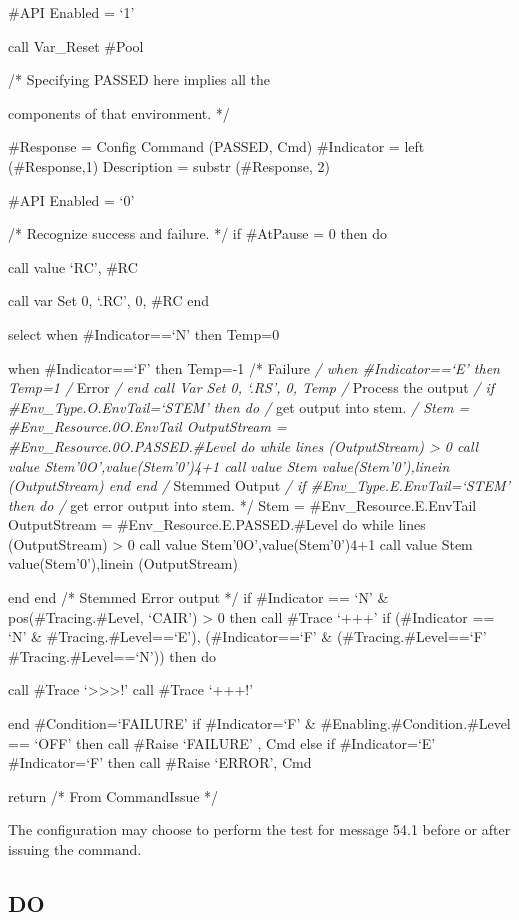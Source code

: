 \#API Enabled = `1'

call Var\_Reset \#Pool

/* Specifying PASSED here implies all the

components of that environment. */

\#Response = Config Command (PASSED, Cmd) \#Indicator = left
(\#Response,1) Description = substr (\#Response, 2)

\#API Enabled = `0'

/* Recognize success and failure. */ if \#AtPause = 0 then do

call value `RC', \#RC

call var Set 0, `.RC', 0, \#RC end

select when \#Indicator==`N' then Temp=0

when \#Indicator==`F' then Temp=-1 /* Failure \emph{/ when
\#Indicator==`E' then Temp=1 /} Error \emph{/ end call Var Set 0, `.RS',
0, Temp /} Process the output \emph{/ if \#Env\_Type.O.EnvTail=`STEM'
then do /} get output into stem. \emph{/ Stem =
\#Env\_Resource.0O.EnvTail OutputStream =
\#Env\_Resource.0O.PASSED.\#Level do while lines (OutputStream)
\textgreater{} 0 call value Stem'0O',value(Stem'0')4+1 call value
Stem\textbar{} \textbar value(Stem'0'),linein (OutputStream) end end /}
Stemmed Output \emph{/ if \#Env\_Type.E.EnvTail=`STEM' then do /} get
error output into stem. */ Stem = \#Env\_Resource.E.EnvTail OutputStream
= \#Env\_Resource.E.PASSED.\#Level do while lines (OutputStream)
\textgreater{} 0 call value Stem'0O',value(Stem'0')4+1 call value
Stem\textbar{} \textbar value(Stem'0'),linein (OutputStream)

end end /* Stemmed Error output */ if \#Indicator == `N' \&
pos(\#Tracing.\#Level, `CAIR') \textgreater{} 0 then call \#Trace `+++'
if (\#Indicator == `N' \& \#Tracing.\#Level==`E'), \textbar{}
(\#Indicator==`F' \& (\#Tracing.\#Level==`F' \textbar{}
\#Tracing.\#Level==`N')) then do

call \#Trace `\textgreater\textgreater\textgreater!' call \#Trace `+++!'

end \#Condition=`FAILURE' if \#Indicator=`F' \&
\#Enabling.\#Condition.\#Level == `OFF' then call \#Raise `FAILURE' ,
Cmd else if \#Indicator=`E' \textbar{} \#Indicator=`F' then call \#Raise
`ERROR', Cmd

return /* From CommandIssue */

The configuration may choose to perform the test for message 54.1 before
or after issuing the command.

\subsection{DO}\label{do}

